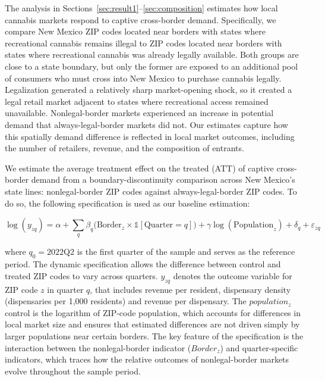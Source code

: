 \documentclass[english,12pt]{article}
\begin{document}
The analysis in Sections~\ref{sec:result1}--\ref{sec:composition} estimates how local cannabis markets respond to captive cross-border demand. Specifically, we compare New Mexico ZIP codes located near borders with states where recreational cannabis remains illegal to ZIP codes located near borders with states where recreational cannabis was already legally available. Both groups are close to a state boundary, but only the former are exposed to an additional pool of consumers who must cross into New Mexico to purchase cannabis legally. Legalization generated a relatively sharp market-opening shock, so it created a legal retail market adjacent to states where recreational access remained unavailable. Nonlegal-border markets experienced an increase in potential demand that always-legal-border markets did not. Our estimates capture how this spatially demand difference is reflected in local market outcomes, including the number of retailers, revenue, and the composition of entrants.

 We estimate the average treatment effect on the treated (ATT) of captive cross-border demand from a boundary-discontinuity comparison across New Mexico's state lines: nonlegal-border ZIP codes against always-legal-border ZIP codes. To do so, the following specification is used as our baseline estimation:

\begin{equation}
\label{baseline}
\log(y_{zq}) = \alpha + \sum_q \beta_q\big(\text{Border}_z \times \mathbb{1}[\text{Quarter}=q]\big) + \gamma\log(\text{Population}_z) + \delta_q + \varepsilon_{zq}
\end{equation}

where \(q_0=2022\text{Q2}\) is the first quarter of the sample and serves as the reference period. The dynamic specification allows the difference between control and treated ZIP codes to vary across quarters. \(y_{zq}\) denotes the outcome variable for ZIP code \(z\) in quarter \(q\), that includes revenue per resident, dispensary density (dispensaries per 1,000 residents) and revenue per dispensary. 
The $population_z$ control is the logarithm of ZIP-code population, which accounts for differences in local market size and ensures that estimated differences are not driven simply by larger populations near certain borders. The key feature of the specification is the interaction between the nonlegal-border indicator ($Border_z$) and quarter-specific indicators, which traces how the relative outcomes of nonlegal-border markets evolve throughout the sample period.
\end{document}
